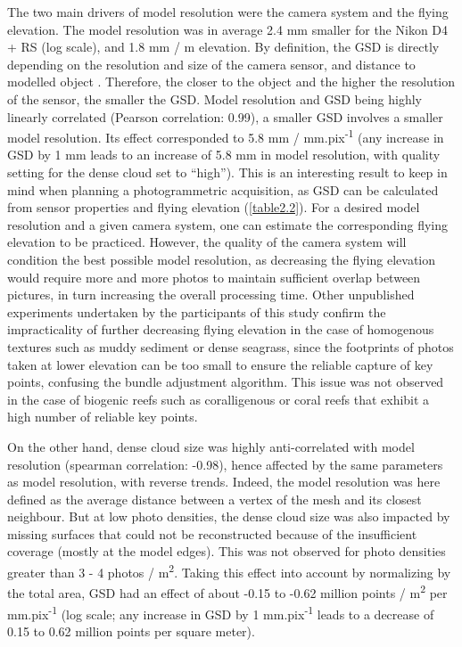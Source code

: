 The two main drivers of model resolution were the camera system and the flying elevation. The model resolution was in average 2.4 mm smaller for the Nikon D4 + RS (log scale), and 1.8 mm / m elevation. By definition, the GSD is directly depending on the resolution and size of the camera sensor, and distance to modelled object \citep{forstner_photogrammetric_2016}. Therefore, the closer to the object and the higher the resolution of the sensor, the smaller the GSD. Model resolution and GSD being highly linearly correlated (Pearson correlation: 0.99), a smaller GSD involves a smaller model resolution. Its effect corresponded to 5.8 mm / mm.pix\textsuperscript{-1} (any increase in GSD by 1 mm leads to an increase of 5.8 mm in model resolution, with quality setting for the dense cloud set to “high”). This is an interesting result to keep in mind when planning a photogrammetric acquisition, as GSD can be calculated from sensor properties and flying elevation (\autoref{table2.2}). For a desired model resolution and a given camera system, one can estimate the corresponding flying elevation to be practiced. However, the quality of the camera system will condition the best possible model resolution, as decreasing the flying elevation would require more and more photos to maintain sufficient overlap between pictures, in turn increasing the overall processing time. Other unpublished experiments undertaken by the participants of this study confirm the impracticality of further decreasing flying elevation in the case of homogenous textures such as muddy sediment or dense seagrass, since the footprints of photos taken at lower elevation can be too small to ensure the reliable capture of key points, confusing the bundle adjustment algorithm. This issue was not observed in the case of biogenic reefs such as coralligenous or coral reefs that exhibit a high number of reliable key points.

On the other hand, dense cloud size was highly anti-correlated with model resolution (spearman correlation: -0.98), hence affected by the same parameters as model resolution, with reverse trends. Indeed, the model resolution was here defined as the average distance between a vertex of the mesh and its closest neighbour. But at low photo densities, the dense cloud size was also impacted by missing surfaces that could not be reconstructed because of the insufficient coverage (mostly at the model edges). This was not observed for photo densities greater than 3 - 4 photos / m\textsuperscript{2}. Taking this effect into account by normalizing by the total area, GSD had an effect of about -0.15 to -0.62 million points / m\textsuperscript{2} per mm.pix\textsuperscript{-1} (log scale; any increase in GSD by 1 mm.pix\textsuperscript{-1} leads to a decrease of 0.15 to 0.62 million points per square meter).

